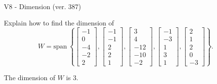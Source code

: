\begin{exercise}
  \begin{exerciseTitle}V8 - Dimension (ver. 387)\end{exerciseTitle}
  \begin{exerciseStatement}
    Explain how to find the dimension of 
\[W=\mathrm{span}\ \left\{\left[\begin{array}{r}
-1 \\
0 \\
-4 \\
-2 \\
2
\end{array}\right] , \left[\begin{array}{r}
-1 \\
-1 \\
2 \\
2 \\
1
\end{array}\right] , \left[\begin{array}{r}
3 \\
4 \\
-12 \\
-10 \\
-2
\end{array}\right] , \left[\begin{array}{r}
-1 \\
-3 \\
1 \\
3 \\
1
\end{array}\right] , \left[\begin{array}{r}
2 \\
1 \\
2 \\
0 \\
-3
\end{array}\right]\right\}.\]



  \end{exerciseStatement}
  \begin{exerciseAnswer}
   The dimension of \(W\) is  \(3\).
  


  \end{exerciseAnswer}
\end{exercise}